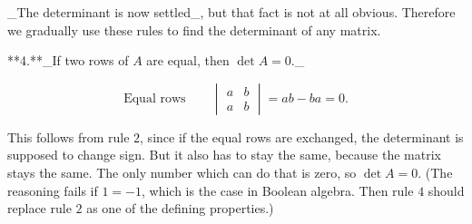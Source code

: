 _The determinant is now settled_, but that fact is not at all obvious. Therefore we gradually use these rules to find the determinant of any matrix.

**4.**_If two rows of \(A\) are equal, then \(\det A=0\)._

\[\mbox{Equal rows}\qquad\begin{vmatrix}a&b\\ a&b\end{vmatrix}=ab-ba=0.\]

This follows from rule \(2\), since if the equal rows are exchanged, the determinant is supposed to change sign. But it also has to stay the same, because the matrix stays the same. The only number which can do that is zero, so \(\det A=0\). (The reasoning fails if \(1=-1\), which is the case in Boolean algebra. Then rule \(4\) should replace rule \(2\) as one of the defining properties.)